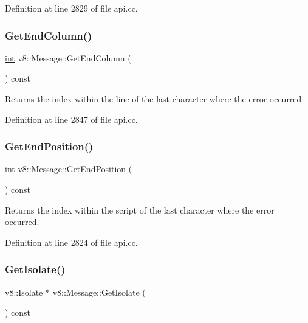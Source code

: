 Definition at line 2829 of file api.\+cc.

\mbox{\label{classv8_1_1Message_ae188ca2457adbb3628681782bc757dc8}} 
\subsubsection{\texorpdfstring{Get\+End\+Column()}{GetEndColumn()}}
{\footnotesize\ttfamily \mbox{\hyperlink{classint}{int}} v8\+::\+Message\+::\+Get\+End\+Column (\begin{DoxyParamCaption}{ }\end{DoxyParamCaption}) const}

Returns the index within the line of the last character where the error occurred. 

Definition at line 2847 of file api.\+cc.

\mbox{\label{classv8_1_1Message_a9a6c55ffea2eb6841d67afec40300641}} 
\subsubsection{\texorpdfstring{Get\+End\+Position()}{GetEndPosition()}}
{\footnotesize\ttfamily \mbox{\hyperlink{classint}{int}} v8\+::\+Message\+::\+Get\+End\+Position (\begin{DoxyParamCaption}{ }\end{DoxyParamCaption}) const}

Returns the index within the script of the last character where the error occurred. 

Definition at line 2824 of file api.\+cc.

\mbox{\label{classv8_1_1Message_a6058f54f4fc67c0370390ea1725b89af}} 
\subsubsection{\texorpdfstring{Get\+Isolate()}{GetIsolate()}}
{\footnotesize\ttfamily v8\+::\+Isolate $\ast$ v8\+::\+Message\+::\+Get\+Isolate (\begin{DoxyParamCaption}{ }\end{DoxyParamCaption}) const}

